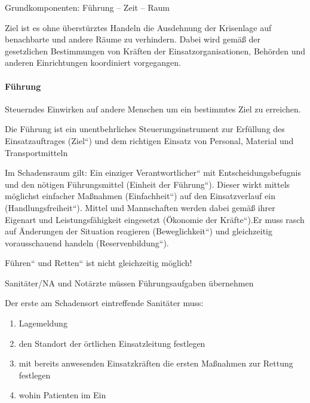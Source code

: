 \documentclass{article}
\begin{document}
Grundkomponenten: F\"uhrung -- Zeit -- Raum 

Ziel ist es ohne \"uberst\"urztes Handeln die Ausdehnung der Krisenlage
auf benachbarte und andere R\"aume zu verhindern. Dabei wird
gem\"a{\ss} der gesetzlichen Bestimmungen von Kr\"aften der
Einsatzorganisationen, Beh\"orden und anderen Einrichtungen koordiniert
vorgegangen.

\paragraph{F\"uhrung}
Steuerndes Einwirken auf andere Menschen um ein bestimmtes Ziel zu
erreichen. 

Die F\"uhrung ist ein unentbehrliches Steuerungsinstrument zur
Erf\"ullung des Einsatzauftrages
({\quotedblbase}Ziel{\textquotedblleft}) und dem richtigen Einsatz von
Personal, Material und Transportmitteln 

Im Schadensraum gilt: {\quotedblbase}Ein einziger
Verantwortlicher{\textquotedblleft} mit Entscheidungsbefugnis und den
n\"otigen F\"uhrungsmittel ({\quotedblbase}Einheit der
F\"uhrung{\textquotedblleft}). Dieser wirkt mittels m\"oglichst
einfacher Ma{\ss}nahmen ({\quotedblbase}Einfachheit{\textquotedblleft})
auf den Einsatzverlauf ein
({\quotedblbase}Handlungsfreiheit{\textquotedblleft}). Mittel und
Mannschaften werden dabei gem\"a{\ss} ihrer Eigenart und
Leistungsf\"ahigkeit eingesetzt ({\quotedblbase}\"Okonomie der
Kr\"afte{\textquotedblleft}).Er muss rasch auf \"Anderungen der
Situation reagieren ({\quotedblbase}Beweglichkeit{\textquotedblleft})
und gleichzeitig vorausschauend handeln
({\quotedblbase}Reservenbildung{\textquotedblleft}).

{\quotedblbase}F\"uhren{\textquotedblleft} und
{\quotedblbase}Retten{\textquotedblleft} ist nicht gleichzeitig
m\"oglich!

Sanit\"ater/NA und Not\"arzte m\"ussen F\"uhrungsaufgaben \"ubernehmen

%
%
Der erste am Schadensort eintreffende Sanit\"ater muss:

\begin{enumerate}
\item Lagemeldung

\item den Standort der \"ortlichen Einsatzleitung festlegen

\item mit bereits anwesenden Einsatzkr\"aften die ersten Ma{\ss}nahmen
zur Rettung festlegen

\item wohin Patienten im Ein

\end{enumerate}
\end{document}

